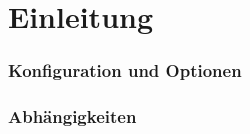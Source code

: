 
\part{Einleitung}\label{part:einleitung}

\section{Konfiguration und Optionen}\label{sec:einleitung-optionen}

\section{Abhängigkeiten}\label{sec:einleitung-abhaengigkeiten}
